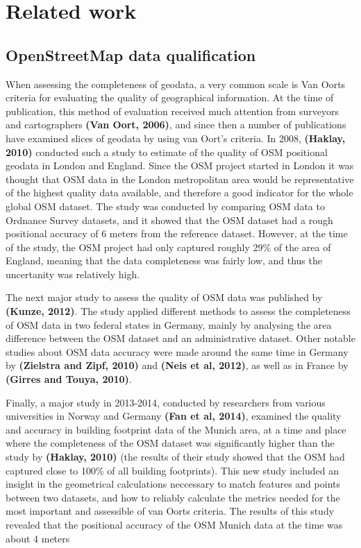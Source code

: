\documentclass{kththesis}
\begin{document}
\section{Related work}

\subsection{OpenStreetMap data qualification}

When assessing the completeness of geodata, a very common scale is Van Oorts criteria for evaluating the quality of geographical information.
At the time of publication, this method of evaluation received much attention from surveyors and cartographers \textbf{(Van Oort, 2006)}, and since then a number of publications have examined slices of geodata by using van Oort's criteria.
In 2008, \textbf{(Haklay, 2010)} conducted such a study to estimate of the quality of OSM positional geodata in London and England.
Since the OSM project started in London it was thought that OSM data in the London metropolitan area would be representative of the highest quality data available, and therefore a good indicator for the whole global OSM dataset.
The study was conducted by comparing OSM data to Ordnance Survey datasets, and it showed that the OSM dataset had a rough positional accuracy of 6 meters from the reference dataset.
However, at the time of the study, the OSM project had only captured roughly 29\% of the area of England, meaning that the data completeness was fairly low, and thus the uncertanity was relatively high.

The next major study to assess the quality of OSM data was published by \textbf{(Kunze, 2012)}.
The study applied different methods to assess the completeness of OSM data in two federal states in Germany, mainly by analysing the area difference between the OSM dataset and an administrative dataset.
Other notable studies about OSM data accuracy were made around the same time in Germany by \textbf{(Zielstra and Zipf, 2010)} and \textbf{(Neis et al, 2012)}, as well as in France by \textbf{(Girres and Touya, 2010)}.

Finally, a major study in 2013-2014, conducted by researchers from various universities in Norway and Germany \textbf{(Fan et al, 2014)}, examined the quality and accuracy in building footprint data of the Munich area, at a time and place where the completeness of the OSM dataset was significantly higher than the study by \textbf{(Haklay, 2010)} (the results of their study showed that the OSM had captured close to 100\% of all building footprints).
This new study included an insight in the geometrical calculations neccessary to match features and points between two datasets, and how to reliably calculate the metrics needed for the most important and assessible of van Oorts criteria.
The results of this study revealed that the positional accuracy of the OSM Munich data at the time was about 4 meters
\end{document}
